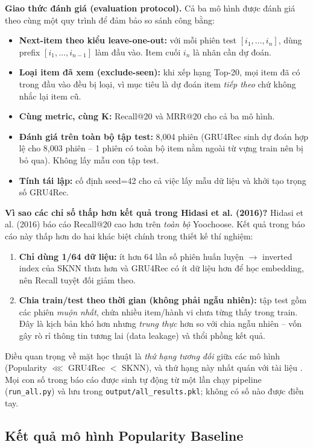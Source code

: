 \documentclass[12pt, a4paper]{article}
\begin{document}
\textbf{Giao thức đánh giá (evaluation protocol).} Cả ba mô hình được đánh giá theo cùng một quy trình để đảm bảo so sánh công bằng:
\begin{itemize}
    \item \textbf{Next-item theo kiểu leave-one-out:} với mỗi phiên test $[i_1, \ldots, i_n]$, dùng prefix $[i_1, \ldots, i_{n-1}]$ làm đầu vào. Item cuối $i_n$ là nhãn cần dự đoán.
    \item \textbf{Loại item đã xem (exclude-seen):} khi xếp hạng Top-20, mọi item đã có trong đầu vào đều bị loại, vì mục tiêu là dự đoán item \emph{tiếp theo} chứ không nhắc lại item cũ.
    \item \textbf{Cùng metric, cùng K:} Recall@20 và MRR@20 cho cả ba mô hình.
    \item \textbf{Đánh giá trên toàn bộ tập test:} 8,004 phiên (GRU4Rec sinh dự đoán hợp lệ cho 8,003 phiên -- 1 phiên có toàn bộ item nằm ngoài từ vựng train nên bị bỏ qua). Không lấy mẫu con tập test.
    \item \textbf{Tính tái lập:} cố định seed=42 cho cả việc lấy mẫu dữ liệu và khởi tạo trọng số GRU4Rec.
\end{itemize}

\textbf{Vì sao các chỉ số thấp hơn kết quả trong Hidasi et al. (2016)?} Hidasi et al. (2016) \cite{hidasi2016} báo cáo Recall@20 cao hơn trên \emph{toàn bộ} Yoochoose. Kết quả trong báo cáo này thấp hơn do hai khác biệt chính trong thiết kế thí nghiệm:
\begin{enumerate}
    \item \textbf{Chỉ dùng 1/64 dữ liệu:} ít hơn 64 lần số phiên huấn luyện $\rightarrow$ inverted index của SKNN thưa hơn và GRU4Rec có ít dữ liệu hơn để học embedding, nên Recall tuyệt đối giảm theo.
    \item \textbf{Chia train/test theo thời gian (không phải ngẫu nhiên):} tập test gồm các phiên \emph{muộn nhất}, chứa nhiều item/hành vi chưa từng thấy trong train. Đây là kịch bản khó hơn nhưng \emph{trung thực} hơn so với chia ngẫu nhiên -- vốn gây rò rỉ thông tin tương lai (data leakage) và thổi phồng kết quả.
\end{enumerate}
Điều quan trọng về mặt học thuật là \emph{thứ hạng tương đối} giữa các mô hình (Popularity $\lll$ GRU4Rec $<$ SKNN), và thứ hạng này nhất quán với tài liệu \cite{ludewig2018}. Mọi con số trong báo cáo được sinh tự động từ một lần chạy pipeline (\texttt{run\_all.py}) và lưu trong \texttt{output/all\_results.pkl}; không có số nào được điền tay.

\subsection{Kết quả mô hình Popularity Baseline}
\end{document}
